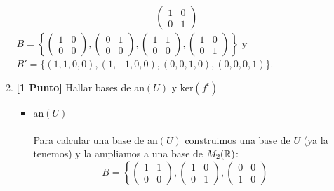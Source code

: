 \documentclass[12pt]{article}
\begin{document}
\begin{enumerate}
\begin{enumerate}
\begin{align*}
\begin{pmatrix}
				                                                                             1 & 0 \\
				                                                                             0 & 1
			                                                                             \end{pmatrix}
		            \end{align*}
		            $B=\left\{\begin{pmatrix}
				            1 & 0 \\
				            0 & 0
			            \end{pmatrix},\begin{pmatrix}
				            0 & 1 \\
				            0 & 0
			            \end{pmatrix},\begin{pmatrix}
				            1 & 1 \\
				            0 & 0
			            \end{pmatrix},\begin{pmatrix}
				            1 & 0 \\
				            0 & 1
			            \end{pmatrix}\right\}$ y  \\$B'=\{(1,1,0,0),(1,-1,0,0),(0,0,1,0),(0,0,0,1)\}$.
		      \item \textbf{[1 Punto]} Hallar bases de an$(U)$ y ker$(f^t)$
		            \begin{itemize}
			            \item an$(U)$ \\ \\
			                  Para calcular una base de an$(U)$ construimos una base de $U$ (ya la tenemos) y la ampliamos a una base de $M_2({\mathbb{R}})$:
			                  \begin{equation*}
				                  B = \left\{ \begin{pmatrix}
					                  1 & 1 \\
					                  0 & 0
				                  \end{pmatrix}, \begin{pmatrix}
					                  1 & 0 \\
					                  0 & 1
				                  \end{pmatrix}, \begin{pmatrix}
					                  0 & 0 \\
					                  1 & 0

\end{pmatrix}
\end{equation*}
\end{itemize}
\end{enumerate}
\end{enumerate}
\end{document}
